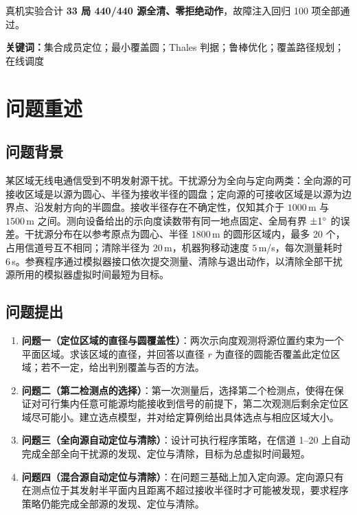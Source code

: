 \documentclass[12pt,a4paper]{ctexart}
\begin{document}
真机实验合计 \textbf{33 局 440/440 源全清、零拒绝动作}，故障注入回归 100 项全部通过。

\vspace{4pt}
\noindent\textbf{关键词：}集合成员定位；最小覆盖圆；Thales 判据；鲁棒优化；覆盖路径规划；在线调度

\newpage

\section{问题重述}

\subsection{问题背景}

某区域无线电通信受到不明发射源干扰。干扰源分为全向与定向两类：全向源的可接收区域是以源为圆心、半径为接收半径的圆盘；定向源的可接收区域是以源为边界点、沿发射方向的半圆盘。接收半径存在不确定性，仅知其介于 $1000\,$m 与 $1500\,$m 之间。测向设备给出的示向度读数带有同一地点固定、全局有界 $\pm 1^{\circ}$ 的误差。干扰源分布在以参考原点为圆心、半径 $1800\,$m 的圆形区域内，最多 20 个，占用信道号互不相同；清除半径为 $20\,$m，机器狗移动速度 $5\,$m/s，每次测量耗时 $6\,$s。参赛程序通过模拟器接口依次提交测量、清除与退出动作，以清除全部干扰源所用的模拟器虚拟时间最短为目标。

\subsection{问题提出}

\begin{enumerate}[leftmargin=2em,itemsep=2pt]
  \item \textbf{问题一（定位区域的直径与圆覆盖性）}：两次示向度观测将源位置约束为一个平面区域。求该区域的直径，并回答以直径 $r$ 为直径的圆能否覆盖此定位区域；若不一定，给出判别覆盖与否的方法。
  \item \textbf{问题二（第二检测点的选择）}：第一次测量后，选择第二个检测点，使得在保证对可行集内任意可能源均能接收到信号的前提下，第二次观测后剩余定位区域尽可能小。建立选点模型，并对给定算例给出具体选点与相应区域大小。
  \item \textbf{问题三（全向源自动定位与清除）}：设计可执行程序策略，在信道 1--20 上自动完成全部全向干扰源的发现、定位与清除，目标为总虚拟时间最短。
  \item \textbf{问题四（混合源自动定位与清除）}：在问题三基础上加入定向源。定向源只有在测点位于其发射半平面内且距离不超过接收半径时才可能被发现，要求程序策略仍能完成全部源的发现、定位与清除。
\end{enumerate}
\end{document}

